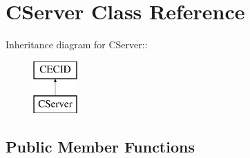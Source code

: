 \section{CServer Class Reference}
\label{classCServer}
Inheritance diagram for CServer::\begin{figure}[H]
\begin{center}
\leavevmode
\includegraphics[height=2cm]{classCServer}
\end{center}
\end{figure}
\subsection*{Public Member Functions}
